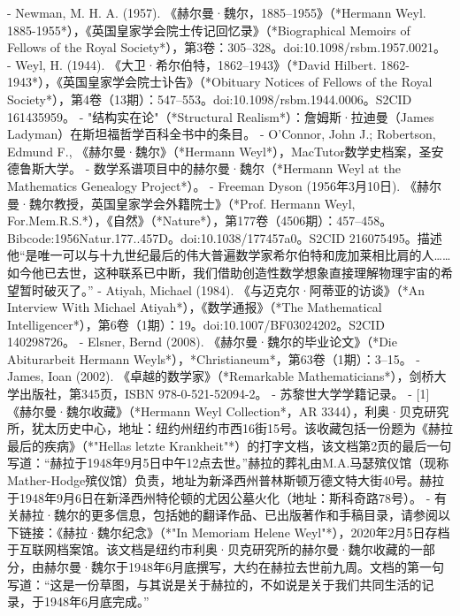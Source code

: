 - Newman, M. H. A. (1957). 《赫尔曼·魏尔，1885–1955》（*Hermann Weyl. 1885-1955*），《英国皇家学会院士传记回忆录》（*Biographical Memoirs of Fellows of the Royal Society*），第3卷：305–328。doi:10.1098/rsbm.1957.0021。  
- Weyl, H. (1944). 《大卫·希尔伯特，1862–1943》（*David Hilbert. 1862-1943*），《英国皇家学会院士讣告》（*Obituary Notices of Fellows of the Royal Society*），第4卷（13期）：547–553。doi:10.1098/rsbm.1944.0006。S2CID 161435959。  
- "结构实在论"（*Structural Realism*）：詹姆斯·拉迪曼（James Ladyman）在斯坦福哲学百科全书中的条目。  
- O'Connor, John J.; Robertson, Edmund F., 《赫尔曼·魏尔》（*Hermann Weyl*），MacTutor数学史档案，圣安德鲁斯大学。  
- 数学系谱项目中的赫尔曼·魏尔（*Hermann Weyl at the Mathematics Genealogy Project*）。  
- Freeman Dyson (1956年3月10日). 《赫尔曼·魏尔教授，英国皇家学会外籍院士》（*Prof. Hermann Weyl, For.Mem.R.S.*），《自然》（*Nature*），第177卷（4506期）：457–458。Bibcode:1956Natur.177..457D。doi:10.1038/177457a0。S2CID 216075495。描述他“是唯一可以与十九世纪最后的伟大普遍数学家希尔伯特和庞加莱相比肩的人……如今他已去世，这种联系已中断，我们借助创造性数学想象直接理解物理宇宙的希望暂时破灭了。”  
- Atiyah, Michael (1984). 《与迈克尔·阿蒂亚的访谈》（*An Interview With Michael Atiyah*），《数学通报》（*The Mathematical Intelligencer*），第6卷（1期）：19。doi:10.1007/BF03024202。S2CID 140298726。  
- Elsner, Bernd (2008). 《赫尔曼·魏尔的毕业论文》（*Die Abiturarbeit Hermann Weyls*），*Christianeum*，第63卷（1期）：3–15。  
- James, Ioan (2002). 《卓越的数学家》（*Remarkable Mathematicians*），剑桥大学出版社，第345页，ISBN 978-0-521-52094-2。  
- 苏黎世大学学籍记录。  
- [1] 《赫尔曼·魏尔收藏》（*Hermann Weyl Collection*，AR 3344），利奥·贝克研究所，犹太历史中心，地址：纽约州纽约市西16街15号。该收藏包括一份题为《赫拉最后的疾病》（*"Hellas letzte Krankheit"*）的打字文档，该文档第2页的最后一句写道：“赫拉于1948年9月5日中午12点去世。”赫拉的葬礼由M.A.马瑟殡仪馆（现称Mather-Hodge殡仪馆）负责，地址为新泽西州普林斯顿万德文特大街40号。赫拉于1948年9月6日在新泽西州特伦顿的尤因公墓火化（地址：斯科奇路78号）。  
- 有关赫拉·魏尔的更多信息，包括她的翻译作品、已出版著作和手稿目录，请参阅以下链接：《赫拉·魏尔纪念》（*"In Memoriam Helene Weyl"*），2020年2月5日存档于互联网档案馆。该文档是纽约市利奥·贝克研究所的赫尔曼·魏尔收藏的一部分，由赫尔曼·魏尔于1948年6月底撰写，大约在赫拉去世前九周。文档的第一句写道：“这是一份草图，与其说是关于赫拉的，不如说是关于我们共同生活的记录，于1948年6月底完成。”  